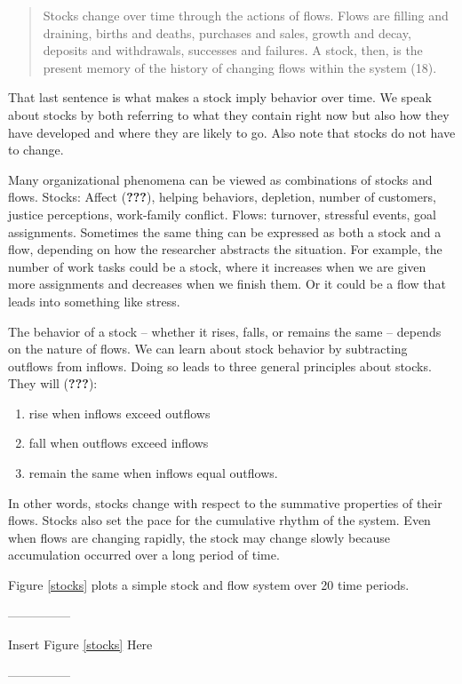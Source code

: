 \documentclass[english,,man]{apa6}
\providecommand{\tightlist}{%
  \setlength{\itemsep}{0pt}\setlength{\parskip}{0pt}}
\theoremstyle{definition}
\theoremstyle{definition}
\theoremstyle{definition}
\theoremstyle{remark}
\begin{document}
\begin{quote}
Stocks change over time through the actions of flows. Flows are filling
and draining, births and deaths, purchases and sales, growth and decay,
deposits and withdrawals, successes and failures. A stock, then, is the
present memory of the history of changing flows within the system (18).
\end{quote}

\noindent That last sentence is what makes a stock imply behavior over
time. We speak about stocks by both referring to what they contain right
now but also how they have developed and where they are likely to go.
Also note that stocks do not have to change.

Many organizational phenomena can be viewed as combinations of stocks
and flows. Stocks: Affect ({\textbf{???}}), helping behaviors,
depletion, number of customers, justice perceptions, work-family
conflict. Flows: turnover, stressful events, goal assignments. Sometimes
the same thing can be expressed as both a stock and a flow, depending on
how the researcher abstracts the situation. For example, the number of
work tasks could be a stock, where it increases when we are given more
assignments and decreases when we finish them. Or it could be a flow
that leads into something like stress.

The behavior of a stock -- whether it rises, falls, or remains the same
-- depends on the nature of flows. We can learn about stock behavior by
subtracting outflows from inflows. Doing so leads to three general
principles about stocks. They will ({\textbf{???}}):

\begin{enumerate}
\def\labelenumi{\arabic{enumi}.}
\tightlist
\item
  rise when inflows exceed outflows
\item
  fall when outflows exceed inflows
\item
  remain the same when inflows equal outflows.
\end{enumerate}

\noindent In other words, stocks change with respect to the summative
properties of their flows. Stocks also set the pace for the cumulative
rhythm of the system. Even when flows are changing rapidly, the stock
may change slowly because accumulation occurred over a long period of
time.

Figure \ref{stocks} plots a simple stock and flow system over 20 time
periods.

\begin{center}

---------------

Insert Figure \ref{stocks} Here

---------------

\end{center}
\end{document}
